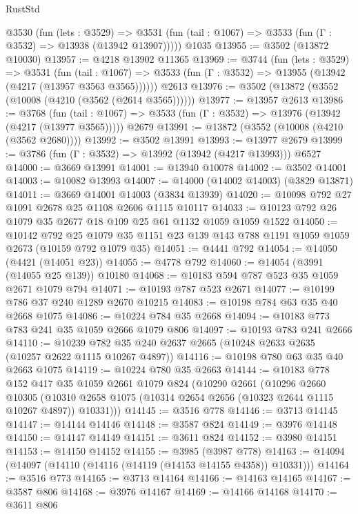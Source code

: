 \begin{lexlean}{RustStd}
\begin{coremodule}
    @3530
      (fun (lets : @3529) =>
      @3531 (fun (tail : @1067) => @3533 (fun (Γ : @3532) => @13938 (@13942 @13907)))))
    @1035
@13955 := @3502 (@13872 @10030)
@13957 := @4218 @13902 @11365
@13969 := @3744
    (fun (lets : @3529) =>
    @3531
      (fun (tail : @1067) =>
      @3533 (fun (Γ : @3532) => @13955 (@13942 (@4217 (@13957 @3563 @3565))))))
    @2613
@13976 := @3502 (@13872 (@3552 (@10008 (@4210 (@3562 (@2614 @3565))))))
@13977 := @13957 @2613
@13986 := @3768
    (fun (tail : @1067) => @3533 (fun (Γ : @3532) => @13976 (@13942 (@4217 (@13977 @3565)))))
    @2679
@13991 := @13872 (@3552 (@10008 (@4210 (@3562 @2680))))
@13992 := @3502 @13991
@13993 := @13977 @2679
@13999 := @3786 (fun (Γ : @3532) => @13992 (@13942 (@4217 @13993))) @6527
@14000 := @3669 @13991
@14001 := @13940 @10078
@14002 := @3502 @14001
@14003 := @10082 @13993
@14007 := @14000 (@14002 @14003) (@3829 @13871)
@14011 := @3669 @14001 @14003 (@3834 @13939)
@14020 := @10098 @792 @27 @1091 @2678 @25 @1108 @2606 @1115 @10117
@14033 := @10123 @792 @26 @1079 @35 @2677 @18 @109 @25 @61 @1132 @1059 @1059 @1522
@14050 := @10142
    @792
    @25
    @1079
    @35
    @1151
    @23
    @139
    @143
    @788
    @1191
    @1059
    @1059
    @2673
    (@10159 @792 @1079 @35)
@14051 := @4441 @792
@14054 := @14050 (@4421 (@14051 @23))
@14055 := @4778 @792
@14060 := @14054 (@3991 (@14055 @25 @139)) @10180
@14068 := @10183 @594 @787 @523 @35 @1059 @2671 @1079 @794
@14071 := @10193 @787 @523 @2671
@14077 := @10199 @786 @37 @240 @1289 @2670 @10215
@14083 := @10198 @784 @63 @35 @40 @2668 @1075
@14086 := @10224 @784 @35 @2668
@14094 := @10183 @773 @783 @241 @35 @1059 @2666 @1079 @806
@14097 := @10193 @783 @241 @2666
@14110 := @10239 @782 @35 @240 @2637 @2665 (@10248 @2633 @2635 (@10257 @2622 @1115 @10267 @4897))
@14116 := @10198 @780 @63 @35 @40 @2663 @1075
@14119 := @10224 @780 @35 @2663
@14144 := @10183
    @778
    @152
    @417
    @35
    @1059
    @2661
    @1079
    @824
    (@10290
      @2661
      (@10296
        @2660
        @10305
        (@10310 @2658 @1075 (@10314 @2654 @2656 (@10323 @2644 @1115 @10267 @4897)) @10331)))
@14145 := @3516 @778
@14146 := @3713 @14145
@14147 := @14144 @14146
@14148 := @3587 @824
@14149 := @3976 @14148
@14150 := @14147 @14149
@14151 := @3611 @824
@14152 := @3980 @14151
@14153 := @14150 @14152
@14155 := @3985 (@3987 @778)
@14163 := @14094 (@14097 (@14110 (@14116 (@14119 (@14153 @14155 @4358)) @10331)))
@14164 := @3516 @773
@14165 := @3713 @14164
@14166 := @14163 @14165
@14167 := @3587 @806
@14168 := @3976 @14167
@14169 := @14166 @14168
@14170 := @3611 @806

\end{coremodule}
\end{lexlean}
